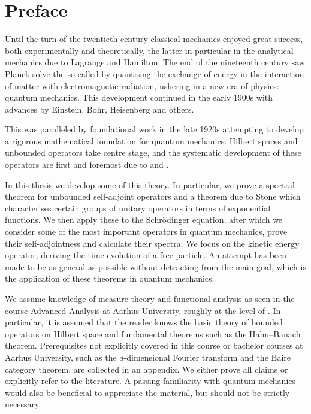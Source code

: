 \documentclass[article, a4paper, 11pt, oneside]{memoir}
\numberwithin{equation}{chapter}
\theoremstyle{myexample}
\theoremstyle{myexample}
\theoremstyle{myexamplebreak}
\theoremstyle{myexamplebreak}
\theoremstyle{nonumberplain}
\theoremstyle{MyNonumberplain}
\begin{document}
\newcommand{\unitary}{\mathrm{U}}
\newcommand{\contcpt}{C_c}
\newcommand{\smoothcpt}{C^\infty_c}
\newcommand{\smoothinf}{C^\infty_0}

\newcommand{\symbolheader}[1]{\multicolumn{2}{l}{\textit{#1}}}

\chapter{Preface}

Until the turn of the twentieth century classical mechanics enjoyed great success, both experimentally and theoretically, the latter in particular in the analytical mechanics due to Lagrange and Hamilton. The end of the nineteenth century saw Planck solve the so-called  by quantising the exchange of energy in the interaction of matter with electromagnetic radiation, ushering in a new era of physics: quantum mechanics. This development continued in the early 1900s with advances by Einstein, Bohr, Heisenberg and others.

This was paralleled by foundational work in the late 1920s attempting to develop a rigorous mathematical foundation for quantum mechanics. Hilbert spaces and unbounded operators take centre stage, and the systematic development of these operators are first and foremost due to \textcite{vonneumann1930} and \textcite{stone1932a}.

In this thesis we develop some of this theory. In particular, we prove a spectral theorem for unbounded self-adjoint operators and a theorem due to Stone which characterises certain groups of unitary operators in terms of exponential functions. We then apply these to the Schrödinger equation, after which we consider some of the most important operators in quantum mechanics, prove their self-adjointness and calculate their spectra. We focus on the kinetic energy operator, deriving the time-evolution of a free particle. An attempt has been made to be as general as possible without detracting from the main goal, which is the application of these theorems in quantum mechanics.

We assume knowledge of measure theory and functional analysis as seen in the course Advanced Analysis at Aarhus University, roughly at the level of \textcite{rudinfunctional}. In particular, it is assumed that the reader knows the basic theory of bounded operators on Hilbert space and fundamental theorems such as the Hahn--Banach theorem. Prerequisites not explicitly covered in this course or bachelor courses at Aarhus University, such as the $d$-dimensional Fourier transform and the Baire category theorem, are collected in an appendix. We either prove all claims or explicitly refer to the literature. A passing familiarity with quantum mechanics would also be beneficial to appreciate the material, but should not be strictly necessary.
\end{document}
